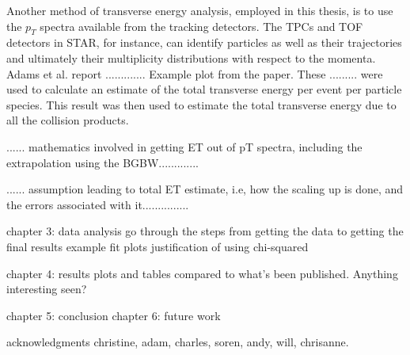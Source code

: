 Another method of transverse energy analysis, employed in this thesis, is to use the $p_{T}$ spectra available from the tracking detectors. The TPCs and TOF detectors in STAR, for instance, can identify particles as well as their trajectories and ultimately their multiplicity distributions with respect to the momenta. Adams et al. \cite{Adams:2004cb} report ............. Example plot from the paper. These ......... were used to calculate an estimate of the total transverse energy per event per particle species. This result was then used to estimate the total transverse energy due to all the collision products.

...... mathematics involved in getting ET out of pT spectra, including the extrapolation using the BGBW.............

...... assumption leading to total ET estimate, i.e, how the scaling up is done, and the errors associated with it...............

chapter 3: data analysis
go through the steps from getting the data to getting the final results
example fit plots
justification of using chi-squared

chapter 4: results
plots and tables compared to what's been published.
Anything interesting seen?

chapter 5: conclusion
chapter 6: future work

acknowledgments
christine, adam, charles, soren, andy, will, chrisanne.



